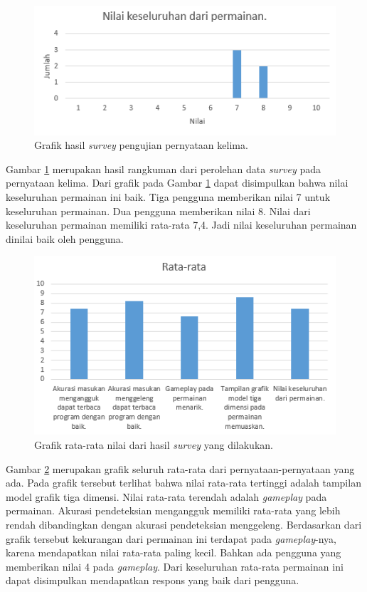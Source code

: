\begin{figure}[htbp]
\centering
\includegraphics[scale=1]{Gambar/PengujianEksperimental/survey_kelima.PNG}
\caption{Grafik hasil \textit{survey} pengujian pernyataan kelima.} 
\label{fig:survey_pengujian_kelima}
\end{figure}

Gambar \ref{fig:survey_pengujian_kelima} merupakan hasil rangkuman dari perolehan data \textit{survey} pada pernyataan kelima. Dari grafik pada Gambar \ref{fig:survey_pengujian_kelima} dapat disimpulkan bahwa nilai keseluruhan permainan ini baik. Tiga pengguna memberikan nilai 7 untuk keseluruhan permainan. Dua pengguna memberikan nilai 8. Nilai dari keseluruhan permainan memiliki rata-rata 7,4. Jadi nilai keseluruhan permainan dinilai baik oleh pengguna.

\begin{figure}[htbp]
\centering
\includegraphics[scale=1]{Gambar/PengujianEksperimental/survey_rata-rata.PNG}
\caption{Grafik rata-rata nilai dari hasil \textit{survey} yang dilakukan.} 
\label{fig:survey_pengujian_rata-rata}
\end{figure}


Gambar \ref{fig:survey_pengujian_rata-rata} merupakan grafik seluruh rata-rata dari pernyataan-pernyataan yang ada. Pada grafik tersebut terlihat bahwa nilai rata-rata tertinggi adalah tampilan model grafik tiga dimensi. Nilai rata-rata terendah adalah \textit{gameplay} pada permainan. Akurasi pendeteksian mengangguk memiliki rata-rata yang lebih rendah dibandingkan dengan akurasi pendeteksian menggeleng. Berdasarkan dari grafik tersebut kekurangan dari permainan ini terdapat pada \textit{gameplay}-nya, karena mendapatkan nilai rata-rata paling kecil. Bahkan ada pengguna yang memberikan nilai 4 pada \textit{gameplay}. Dari keseluruhan rata-rata permainan ini dapat disimpulkan mendapatkan respons yang baik dari pengguna.



